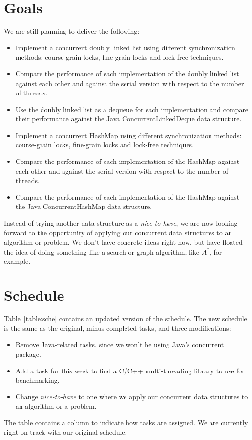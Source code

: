 \documentclass[11pt]{article}
\begin{document}
\section*{Goals}
We are still planning to deliver the following:
\begin{itemize}
\item
Implement a concurrent doubly linked list using different
synchronization methods: course-grain locks, fine-grain locks and lock-free
techniques.
\item Compare the performance of each implementation of the doubly
linked list against each other and against the serial version with respect to
the number of threads.
\item Use the doubly linked list as a dequeue for each implementation and compare
their performance against the Java ConcurrentLinkedDeque data structure.
\item Implement a concurrent HashMap using different synchronization methods:
course-grain locks, fine-grain locks and lock-free techniques.
\item Compare the performance of each implementation of the HashMap against
each other and against the serial version with respect to the number of threads.
\item Compare the performance of each implementation of the HashMap against
the Java ConcurrentHashMap data structure.
\end{itemize}

Instead of trying another data structure as a {\it nice-to-have}, we are now
looking forward to the opportunity of applying our concurrent data structures to
an algorithm or problem. We don't have concrete ideas right now, but have
floated the idea of doing something like a search or graph algorithm, like
$A^*$, for example.

\section*{Schedule}
Table~\ref{table:sche} contains an updated version of the schedule. The new
schedule is the same as the original, minus completed tasks, and three
modifications:

\begin{itemize}
\item
Remove Java-related tasks, since we won't be using Java's concurrent package.
\item
Add a task for this week to find a C/C++ multi-threading library to use for
benchmarking.
\item
Change {\it nice-to-have} to one where we apply our concurrent data structures
to an algorithm or a problem.
\end{itemize}

The table contains a column to indicate how tasks are assigned. We are currently
right on track with our original schedule.
\end{document}
